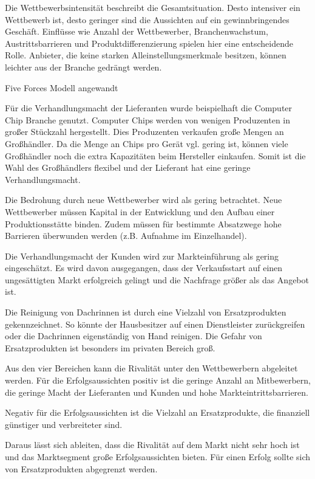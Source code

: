     \noindent
    Die Wettbewerbsintensität beschreibt die Gesamtsituation. Desto intensiver ein Wettbewerb ist, desto geringer sind
    die Aussichten auf ein gewinnbringendes Geschäft. Einflüsse wie Anzahl der Wettbewerber, Branchenwachstum,
    Austrittsbarrieren und Produktdifferenzierung spielen hier eine entscheidende Rolle. Anbieter, die keine starken
    Alleinstellungsmerkmale besitzen, können leichter aus der Branche gedrängt werden.

    \noindent
    Five Forces Modell angewandt

    \noindent
    Für die Verhandlungsmacht der Lieferanten wurde beispielhaft die Computer Chip Branche genutzt. Computer Chips
    werden von wenigen Produzenten in großer Stückzahl hergestellt. Dies Produzenten verkaufen große Mengen an
    Großhändler. Da die Menge an Chips pro Gerät vgl. gering ist, können viele Großhändler noch die extra Kapazitäten
    beim Hersteller einkaufen. Somit ist die Wahl des Großhändlers flexibel und der Lieferant hat eine geringe
    Verhandlungsmacht.

    \noindent
    Die Bedrohung durch neue Wettbewerber wird als gering betrachtet. Neue Wettbewerber müssen Kapital in der
    Entwicklung und den Aufbau einer Produktionsstätte binden. Zudem müssen für bestimmte Absatzwege hohe Barrieren
    überwunden werden (z.B. Aufnahme im Einzelhandel).

    \noindent
    Die Verhandlungsmacht der Kunden wird zur Markteinführung als gering eingeschätzt. Es wird davon ausgegangen, dass
    der Verkaufsstart auf einen ungesättigten Markt erfolgreich gelingt und die Nachfrage größer als das Angebot ist.

    \noindent
    Die Reinigung von Dachrinnen ist durch eine Vielzahl von Ersatzprodukten gekennzeichnet. So könnte der Hausbesitzer
    auf einen Dienstleister zurückgreifen oder die Dachrinnen eigenständig von Hand reinigen. Die Gefahr von
    Ersatzprodukten ist besonders im privaten Bereich groß.

    \noindent
    Aus den vier Bereichen kann die Rivalität unter den Wettbewerbern abgeleitet werden. Für die Erfolgsaussichten
    positiv ist die geringe Anzahl an Mitbewerbern, die geringe Macht der Lieferanten und Kunden und hohe
    Markteintrittsbarrieren.

    \noindent
    Negativ für die Erfolgsaussichten ist die Vielzahl an Ersatzprodukte, die finanziell günstiger und verbreiteter
    sind.

    \noindent
    Daraus lässt sich ableiten, dass die Rivalität auf dem Markt nicht sehr hoch ist und das Marktsegment große
    Erfolgsaussichten bieten. Für einen Erfolg sollte sich von Ersatzprodukten abgegrenzt werden.

